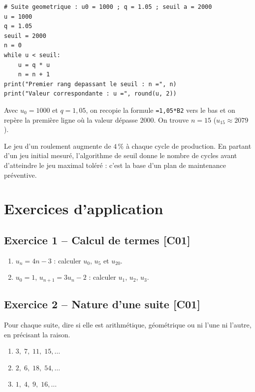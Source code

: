 \documentclass[a4paper,11pt]{article}
\begin{document}
\begin{lstlisting}[style=uimmpython, caption={Plus petit rang n tel que u(n) depasse un seuil}]
# Suite geometrique : u0 = 1000 ; q = 1.05 ; seuil a = 2000
u = 1000
q = 1.05
seuil = 2000
n = 0
while u < seuil:
    u = q * u
    n = n + 1
print("Premier rang depassant le seuil : n =", n)
print("Valeur correspondante : u =", round(u, 2))
\end{lstlisting}

\begin{exemple}
Avec $u_0 = 1000$ et $q = 1{,}05$, on recopie la formule \texttt{=1,05*B2} vers le bas et on repère la première ligne où la valeur dépasse $2000$. On trouve $n = 15$ ($u_{15} \approx 2079$).
\end{exemple}

\begin{appliindus}
Le jeu d'un roulement augmente de $4\,\%$ à chaque cycle de production. En partant d'un jeu initial mesuré, l'algorithme de seuil donne le nombre de cycles avant d'atteindre le jeu maximal toléré : c'est la base d'un plan de maintenance préventive.
\end{appliindus}

\newpage
\section{Exercices d'application}

\subsection*{Exercice 1 -- Calcul de termes \hfill {\normalsize\color{uimmred}[C01]}}
\begin{enumerate}[label=\alph*)]
  \item $u_n = 4n - 3$ : calculer $u_0$, $u_5$ et $u_{20}$.
  \item $u_0 = 1$, $u_{n+1} = 3u_n - 2$ : calculer $u_1$, $u_2$, $u_3$.
\end{enumerate}

\subsection*{Exercice 2 -- Nature d'une suite \hfill {\normalsize\color{uimmred}[C01]}}
Pour chaque suite, dire si elle est arithmétique, géométrique ou ni l'une ni l'autre, en précisant la raison.
\begin{enumerate}[label=\alph*)]
  \item $3,\; 7,\; 11,\; 15,\dots$
  \item $2,\; 6,\; 18,\; 54,\dots$
  \item $1,\; 4,\; 9,\; 16,\dots$
\end{enumerate}
\end{document}
